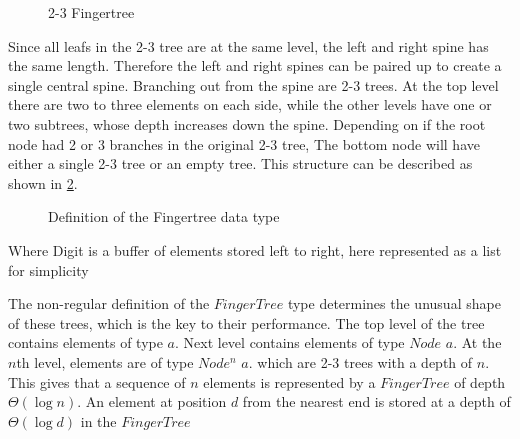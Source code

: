 \begin{figure}[!h]
\centering
{} 
\caption{2-3 Fingertree
\label{fig:fingertree}}
\end{figure}

Since all leafs in the 2-3 tree are at the same level, the left and right
spine has the same length. Therefore the left and right spines can be paired up
to create a single central spine. Branching out from the spine are 2-3 trees. At
the top level there are two to three elements on each side, while the other
levels have one or two subtrees, whose depth increases down the spine.
Depending on if the root node had 2 or 3 branches in the original 2-3 tree, The
bottom node will have either a single 2-3 tree or an empty tree. This structure
can be described as shown in \cref{fig:DataTypeFingertree}.

\begin{figure}[h!]

\caption{Definition of the Fingertree data type \label{fig:DataTypeFingertree}}
\end{figure}

Where Digit is a buffer of elements stored left to right, here represented as a
list for simplicity

The non-regular definition of the $FingerTree$ type determines the unusual shape
of these trees, which is the key to their performance. The top level of the tree
contains elements of type $a$. Next level contains elements of type $Node$ $a$.
At the $n$th level, elements are of type $Node^n$ $a$. which are 2-3 trees with
a depth of $n$. This gives that a sequence of $n$ elements is represented by
a $FingerTree$ of depth $\Theta(\log n)$. An element at position $d$ from
the nearest end is stored at a depth of $\Theta(\log d)$ in the $FingerTree$

